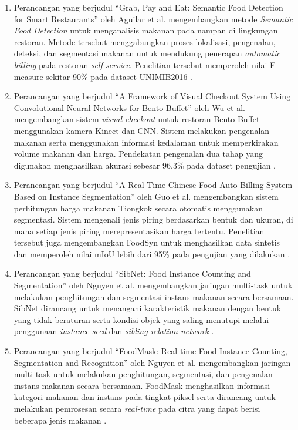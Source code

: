 \begin{enumerate}
    \item Perancangan yang berjudul ``Grab, Pay and Eat: Semantic Food Detection for Smart Restaurants'' oleh Aguilar et al. mengembangkan metode \textit{Semantic Food Detection} untuk menganalisis makanan pada nampan di lingkungan restoran. Metode tersebut menggabungkan proses lokalisasi, pengenalan, deteksi, dan segmentasi makanan untuk mendukung penerapan \textit{automatic billing} pada restoran \textit{self-service}. Penelitian tersebut memperoleh nilai F-measure sekitar 90\% pada dataset UNIMIB2016 \cite{aguilar2017}.

    \item Perancangan yang berjudul ``A Framework of Visual Checkout System Using Convolutional Neural Networks for Bento Buffet'' oleh Wu et al. mengembangkan sistem \textit{visual checkout} untuk restoran Bento Buffet menggunakan kamera Kinect dan CNN. Sistem melakukan pengenalan makanan serta menggunakan informasi kedalaman untuk memperkirakan volume makanan dan harga. Pendekatan pengenalan dua tahap yang digunakan menghasilkan akurasi sebesar 96,3\% pada dataset pengujian \cite{wu2021}.

    \item Perancangan yang berjudul ``A Real-Time Chinese Food Auto Billing System Based on Instance Segmentation'' oleh Guo et al. mengembangkan sistem perhitungan harga makanan Tiongkok secara otomatis menggunakan segmentasi. Sistem mengenali jenis piring berdasarkan bentuk dan ukuran, di mana setiap jenis piring merepresentasikan harga tertentu. Penelitian tersebut juga mengembangkan FoodSyn untuk menghasilkan data sintetis dan memperoleh nilai mIoU lebih dari 95\% pada pengujian yang dilakukan \cite{guo2023}.

    \item Perancangan yang berjudul ``SibNet: Food Instance Counting and Segmentation'' oleh Nguyen et al. mengembangkan jaringan multi-task untuk melakukan penghitungan dan segmentasi instans makanan secara bersamaan. SibNet dirancang untuk menangani karakteristik makanan dengan bentuk yang tidak beraturan serta kondisi objek yang saling menutupi melalui penggunaan \textit{instance seed} dan \textit{sibling relation network} \cite{nguyen2022sibnet}.

    \item Perancangan yang berjudul ``FoodMask: Real-time Food Instance Counting, Segmentation and Recognition'' oleh Nguyen et al. mengembangkan jaringan multi-task untuk melakukan penghitungan, segmentasi, dan pengenalan instans makanan secara bersamaan. FoodMask menghasilkan informasi kategori makanan dan instans pada tingkat piksel serta dirancang untuk melakukan pemrosesan secara \textit{real-time} pada citra yang dapat berisi beberapa jenis makanan \cite{nguyen2023foodmask}.


\end{enumerate}
